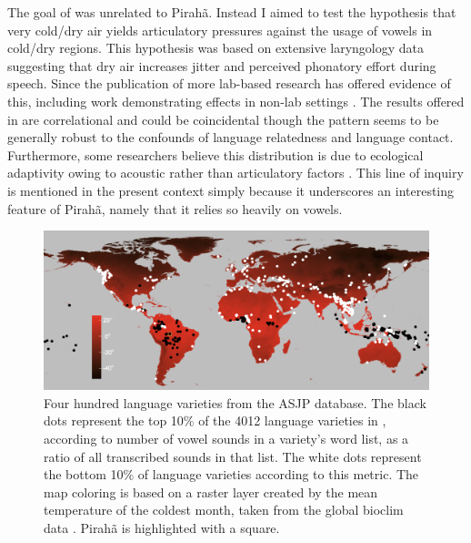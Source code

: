 \documentclass[output=paper,colorlinks,citecolor=brown
]{langscibook}
\begin{document}
    The goal of  was unrelated to Pirahã. Instead I aimed to test the hypothesis that very cold/dry air yields articulatory pressures against the usage of vowels in cold/dry regions. This hypothesis was based on extensive laryngology data suggesting that dry air increases jitter and perceived phonatory effort during speech. Since the publication of  more lab-based research has offered evidence of this, including work demonstrating effects in non-lab settings \citep{alves2019effect}. The results offered in  are correlational and could be coincidental though the pattern seems to be generally robust to the confounds of language relatedness and language contact. Furthermore, some researchers believe this distribution is due to ecological adaptivity owing to acoustic rather than articulatory factors \citep{maddieson2018language}. This line of inquiry is mentioned in the present context simply because it underscores an interesting feature of Pirahã, namely that it relies so heavily on vowels.


\begin{figure}
\centering
\includegraphics[width=1\textwidth]{everett_figure4.png}
\caption{\label{fig:Figure 4}Four hundred language varieties from the ASJP database. The black dots represent the top 10\% of the 4012 language varieties in , according to number of vowel sounds in a variety’s word list, as a ratio of all transcribed sounds in that list. The white dots represent the bottom 10\% of language varieties according to this metric. The map coloring is based on a raster layer created by the mean temperature of the coldest month, taken from the global bioclim data \citep{noce2020new}. Pirahã is highlighted with a square.}

\end{figure}
\end{document}
